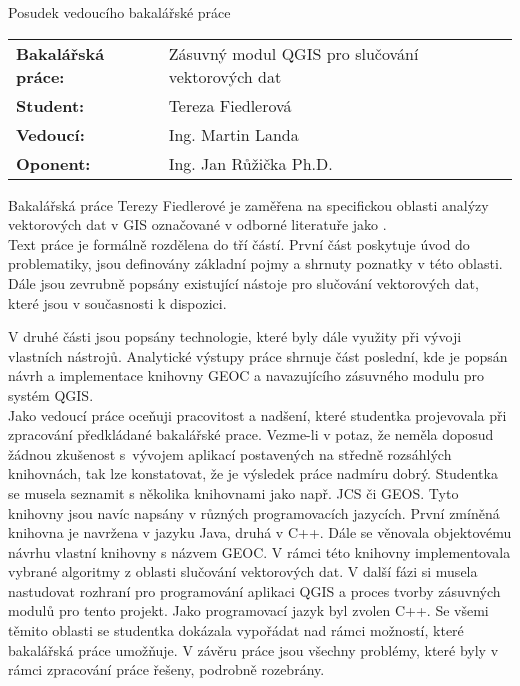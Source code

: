 \documentclass[czech,11pt,a4paper]{article}
\begin{document}
\begin{center}
  {\Large Posudek vedoucího bakalářské práce}
\end{center}

\vspace{.5cm}

\noindent \begin{tabular}{lp{}}
  {\bf Bakalářská práce:} &
  Zásuvný modul QGIS pro slučování vektorových dat \\
  {\bf Student:} & Tereza Fiedlerová \\
  {\bf Vedoucí:} & Ing. Martin Landa \\
  {\bf Oponent:} & Ing. Jan Růžička Ph.D. \\
\end{tabular}

\vspace{1cm}

Bakalářská práce Terezy Fiedlerové je zaměřena na specifickou oblasti
analýzy vektorových dat v GIS označované v odborné literatuře jako
.
\\

Text práce je formálně rozdělena do tří částí. První část poskytuje
úvod do problematiky, jsou definovány základní pojmy a shrnuty
poznatky v této oblasti. Dále jsou zevrubně popsány existující nástoje
pro slučování vektorových dat, které jsou v současnosti k dispozici.

V druhé části jsou popsány technologie, které byly dále využity při
vývoji vlastních nástrojů. Analytické výstupy práce shrnuje část
poslední, kde je popsán návrh a implementace knihovny GEOC a
navazujícího zásuvného modulu pro systém QGIS.
\\

Jako vedoucí práce oceňuji pracovitost a nadšení, které studentka
projevovala při zpracování předkládané bakalářské prace. Vezme-li v
potaz, že neměla doposud žádnou zkušenost s~vývojem aplikací
postavených na středně rozsáhlých knihovnách, tak lze konstatovat, že
je výsledek práce nadmíru dobrý. Studentka se musela seznamit s
několika knihovnami jako např. JCS či GEOS. Tyto knihovny jsou navíc
napsány v různých programovacích jazycích. První zmíněná knihovna je
navržena v jazyku Java, druhá v C++. Dále se věnovala objektovému
návrhu vlastní knihovny s názvem GEOC. V rámci této knihovny
implementovala vybrané algoritmy z oblasti slučování vektorových
dat. V další fázi si musela nastudovat rozhraní pro programování
aplikaci QGIS a proces tvorby zásuvných modulů pro tento projekt. Jako
programovací jazyk byl zvolen C++. Se všemi těmito oblasti se
studentka dokázala vypořádat nad rámci možností, které bakalářská
práce umožňuje. V závěru práce jsou všechny problémy, které byly v
rámci zpracování práce řešeny, podrobně rozebrány.
\\
\end{document}
